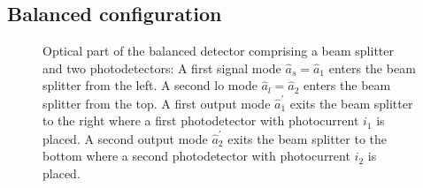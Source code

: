 
\subsection{Balanced configuration}


\begin{figure}[htb]
    \centering
    
    \caption{Optical part of the balanced detector comprising a beam splitter and two photodetectors: A first signal mode $\hat{a}_s=\hat{a}_1$ enters the beam splitter from the left. A second \gls{lo} mode $\hat{a}_l=\hat{a}_2$ enters the beam splitter from the top. A first output mode $\hat{a}_1^\prime$ exits the beam splitter to the right where a first photodetector with photocurrent $i_1$ is placed. A second output mode $\hat{a}_2^\prime$ exits the beam splitter to the bottom where a second photodetector with photocurrent $i_2$ is placed.}\label{fig:balanced_detector_optics}
\end{figure}

